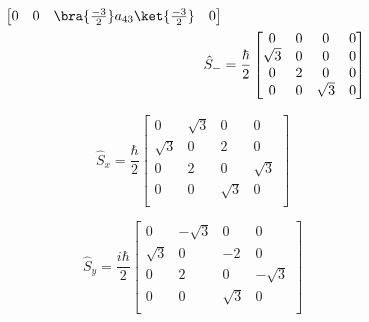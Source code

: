 \documentclass{article}
\begin{document}
\begin{enumerate}
\begin{align}
\begin{bmatrix}
				0 & 0 & \bra{\frac{-3}{2}} a_{43} \ket{\frac{-3}{2}} & 0 \\
			\end{bmatrix} \\
			\hat{S}_- &= \frac{\hbar}{2}
			\begin{bmatrix}
				0 & 0 & 0 & 0 \\
				\sqrt{3} & 0 & 0 & 0 \\
				0 & 2 & 0 & 0 \\
				0 & 0 & \sqrt{3} & 0 \\
			\end{bmatrix}
		\end{align}
		\begin{minipage}{0.45\textwidth}
			\begin{equation}
				\hat{S}_x = \frac{\hbar}{2}
				\begin{bmatrix}
					0 & \sqrt{3} & 0 & 0 \\
					\sqrt{3} & 0 & 2 & 0 \\
					0 & 2 & 0 & \sqrt{3} \\
					0 & 0 & \sqrt{3} & 0 \\
				\end{bmatrix}
			\end{equation}
		\end{minipage}
		\begin{minipage}{0.45\textwidth}
			\begin{equation}
				\hat{S}_y = \frac{i\hbar}{2}
				\begin{bmatrix}
					0 & -\sqrt{3} & 0 & 0 \\
					\sqrt{3} & 0 & -2 & 0 \\
					0 & 2 & 0 & -\sqrt{3} \\
					0 & 0 & \sqrt{3} & 0 \\
				\end{bmatrix}
			\end{equation}
		\end{minipage}
		

\end{enumerate}
\end{document}
